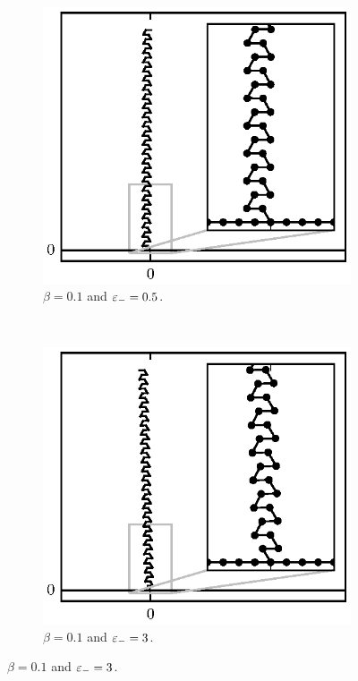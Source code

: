 {	%
	\begin{figure}[h!]
		\centering
		\begin{subfigure}{.5\textwidth}
			\centering
			\includegraphics{./fig/ch3/fs/b0.1_eb0.5.eps}
			\caption{$\beta=0.1$ and $\varepsilon_-=0.5$.\label{subfig:hex_chain}}
		\end{subfigure}%
		~
		\begin{subfigure}{.5\textwidth}
			\centering
			\includegraphics{./fig/ch3/fs/b0.1_eb3.eps}
			\caption{$\beta=0.1$ and $\varepsilon_-=3$.\label{subfig:leaning_hex_chain}}
		\end{subfigure}


\end{figure}}
